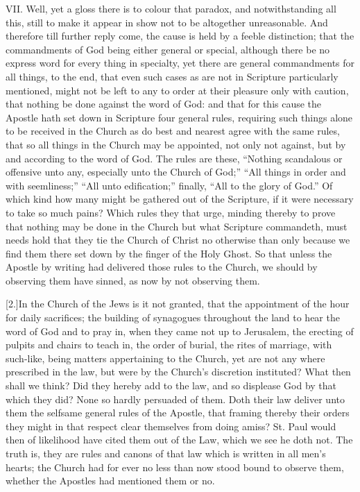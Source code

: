 VII. Well, yet a gloss there is to colour that paradox, and notwithstanding all this, still to make it appear in show not to be altogether unreasonable. And therefore till further reply come, the cause is held by a feeble distinction; that the commandments of God being either general or special, although there be no express word for every thing in specialty, yet there are general commandments for all things, to the end, that even such cases as are not in Scripture particularly mentioned, might not be left to any to order at their pleasure only with caution, that nothing be done against the word of God: and that for this cause the Apostle hath set down in Scripture four general rules, requiring such things alone to be received in the Church as do best and nearest agree with the same rules, that so all things in the Church may be appointed, not only not against, but by and according to the word of God. The rules are these, “Nothing scandalous or offensive unto any, especially unto the Church of God;” “All things in order and with seemliness;” “All unto edification;” finally, “All to the glory of God.” Of which kind how many might be gathered out of the Scripture, if it were necessary to take so much pains? Which rules they that urge, minding thereby to prove that nothing may be done in the Church but what Scripture commandeth, must needs hold that they tie the Church of Christ no otherwise than only because we find them there set down by the finger of the Holy Ghost. So that unless the Apostle by writing had delivered those rules to the Church, we should by observing them have sinned, as now by not observing them.

[2.]In the Church of the Jews is it not granted, that the appointment of the hour for daily sacrifices; the building of synagogues throughout the land to hear the word of God and  to pray in, when they came not up to Jerusalem, the erecting of pulpits and chairs to teach in, the order of burial, the rites of marriage, with such-like, being matters appertaining to the Church, yet are not any where prescribed in the law, but were by the Church’s discretion instituted? What then shall we think? Did they hereby add to the law, and so displease God by that which they did? None so hardly persuaded of them. Doth their law deliver unto them the selfsame general rules of the Apostle, that framing thereby their orders they might in that respect clear themselves from doing amiss? St. Paul would then of likelihood have cited them out of the Law, which we see he doth not. The truth is, they are rules and canons of that law which is written in all men’s hearts; the Church had for ever no less than now stood bound to observe them, whether the Apostles had mentioned them or no.

